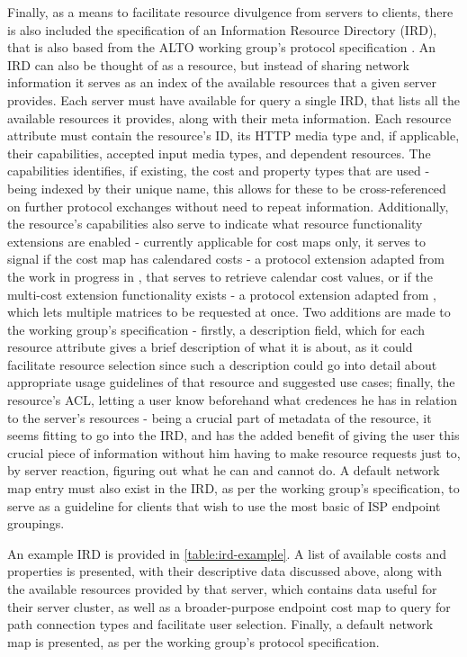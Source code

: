     Finally, as a means to facilitate resource divulgence from servers to clients, there is also included the specification of an Information Resource Directory (IRD), that is also based from the ALTO working group's protocol specification \cite{alto-protocol}.
    An IRD can also be thought of as a resource, but instead of sharing network information it serves as an index of the available resources that a given server provides.
    Each server must have available for query a single IRD, that lists all the available resources it provides, along with their meta information.
    Each resource attribute must contain the resource's ID, its HTTP media type and, if applicable, their capabilities, accepted input media types, and dependent resources.
    The capabilities identifies, if existing, the cost and property types that are used - being indexed by their unique name, this allows for these to be cross-referenced on further protocol exchanges without need to repeat information.
    Additionally, the resource's capabilities also serve to indicate what resource functionality extensions are enabled - currently applicable for cost maps only, it serves to signal if the cost map has calendared costs - a protocol extension adapted from the work in progress in \cite{alto-calendar-cost-map}, that serves to retrieve calendar cost values, or if the multi-cost extension functionality exists - a protocol extension adapted from \cite{alto-multi-cost}, which lets multiple matrices to be requested at once.
    Two additions are made to the working group's specification - firstly, a description field, which for each resource attribute gives a brief description of what it is about, as it could facilitate resource selection since such a description could go into detail about appropriate usage guidelines of that resource and suggested use cases; finally, the resource's ACL, letting a user know beforehand what credences he has in relation to the server's resources - being a crucial part of metadata of the resource, it seems fitting to go into the IRD, and has the added benefit of giving the user this crucial piece of information without him having to make resource requests just to, by server reaction, figuring out what he can and cannot do.
    A default network map entry must also exist in the IRD, as per the working group's specification, to serve as a guideline for clients that wish to use the most basic of ISP endpoint groupings.

    An example IRD is provided in \ref{table:ird-example}.
    A list of available costs and properties is presented, with their descriptive data discussed above, along with the available resources provided by that server, which contains data useful for their server cluster, as well as a broader-purpose endpoint cost map to query for path connection types and facilitate user selection.
    Finally, a default network map is presented, as per the working group's protocol specification.

